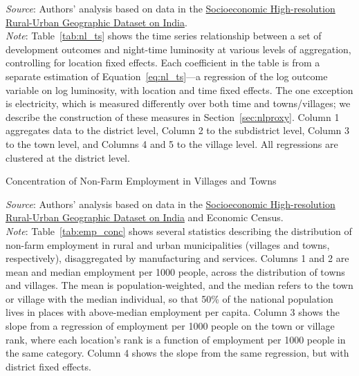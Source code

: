 \documentclass[12pt,letterpaper]{article}
\begin{document}
\begin{appendix}
\begin{landscape}
\begin{table}[H]
  \begin{center}
    \footnotesize{}
  \end{center}
  \footnotesize{\textit{Source}: Authors' analysis based on data in the
    \href{http://www.devdatalab.org/shrug}{Socioeconomic
      High-resolution Rural-Urban Geographic Dataset on
      India}. \\ \textit{Note}: Table~\ref{tab:nl_ts} shows the time
    series relationship between a set of development outcomes and
    night-time luminosity at various levels of aggregation,
    controlling for location fixed effects. Each coefficient in the
    table is from a separate estimation of Equation~\ref{eq:nl_ts}---a
    regression of the log outcome variable on log luminosity, with
    location and time fixed effects. The one exception is electricity,
    which is measured differently over both time and towns/villages;
    we describe the construction of these measures in
    Section~\ref{sec:nlproxy}. Column 1 aggregates data to the district
    level, Column 2 to the subdistrict level, Column 3 to the town
    level, and Columns 4 and 5 to the village level. All regressions
    are clustered at the district level.}
  \label{tab:nl_ts}
\end{table}
\end{landscape}

\begin{table}[H]
  \caption{Concentration of Non-Farm Employment in Villages and Towns} 

  \footnotesize{}
  
    \footnotesize{\textit{Source}: Authors' analysis based on data in
      the \href{http://www.devdatalab.org/shrug}{Socioeconomic
        High-resolution Rural-Urban Geographic Dataset on
        India} and Economic Census. \\ \textit{Note}: Table~\ref{tab:emp_conc} shows several
      statistics describing the distribution of non-farm employment in
      rural and urban municipalities (villages and towns,
      respectively), disaggregated by manufacturing and
      services. Columns 1 and 2 are mean and median employment per
      1000 people, across the distribution of towns and villages. The
      mean is population-weighted, and the median refers to the town
      or village with the median individual, so that 50\% of the
      national population lives in places with above-median employment
      per capita. Column 3 shows the slope from a regression of
      employment per 1000 people on the town or village rank, where
      each location's rank is a function of employment per 1000 people
      in the same category. Column 4 shows the slope from the same
      regression, but with district fixed effects.}


\end{table}
\end{appendix}
\end{document}
